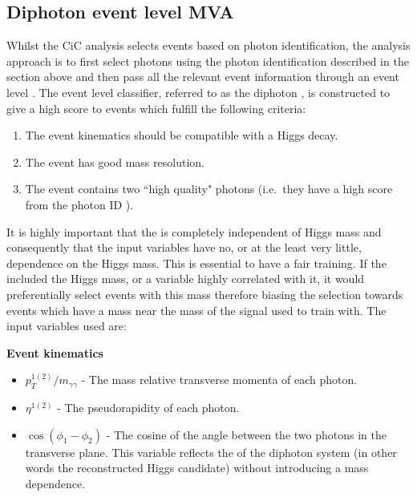 \subsection{Diphoton event level MVA}
\label{sec:diphoton_bdt}

Whilst the CiC analysis selects events based on photon identification, the \MVA analysis approach is to first select photons using the photon identification \BDT described in the section above and then pass all the relevant event information through an event level \BDT. The event level classifier, referred to as the diphoton \BDT, is constructed to give a high score to events which fulfill the following criteria:

\begin{enumerate}
  \item The event kinematics should be compatible with a Higgs decay.
  \item The event has good mass resolution.
  \item The event contains two ``high quality" photons (i.e.~they have a high score from the photon ID \BDT).
\end{enumerate}

It is highly important that the \BDT is completely independent of Higgs mass and consequently that the input variables have no, or at the least very little, dependence on the Higgs mass. This is essential to have a fair training. If the \BDT included the Higgs mass, or a variable highly correlated with it, it would preferentially select events with this mass therefore biasing the selection towards events which have a mass near the mass of the signal used to train with. The input variables used are:

\noindent\textbf{Event kinematics}
\begin{itemize}
  \item $p_{T}^{1(2)}/m_{\gamma\gamma}$ - The mass relative transverse momenta of each photon.
  \item $\eta^{1(2)}$ - The pseudorapidity of each photon.
  \item $\cos(\phi_{1}-\phi_{2})$ - The cosine of the angle between the two photons in the transverse plane. This variable reflects the \pT of the diphoton system (in other words the reconstructed Higgs candidate) without introducing a mass dependence.
\end{itemize}

